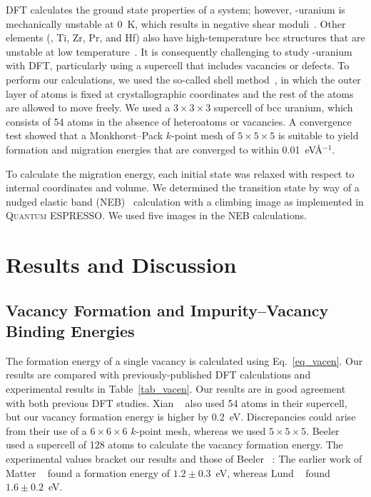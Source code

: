 DFT calculates the ground state properties of a system;
however, \textgamma-uranium is mechanically unstable at 0~K, which results in
negative shear moduli~\cite{soderlind1998theory}.
Other elements (\eg, Ti, Zr, Pr, and Hf)
also have high-temperature bcc structures that are unstable at low
temperature~\cite{ye1987phonon,sanchez1975model}. 
It is consequently challenging to study \textgamma-uranium with DFT,
particularly using a supercell that includes vacancies or defects.
To perform our calculations, we used the so-called shell
method~\cite{beeler2010first}, in which the outer layer of atoms is fixed at
crystallographic coordinates and the rest of the atoms are allowed to move
freely.
We used a $3\times3\times3$ supercell of bcc uranium, which consists of 54
atoms in the absence of heteroatoms or vacancies.
A convergence test showed that a Monkhorst--Pack $k$-point mesh of
$5\times5\times5$ is suitable to yield formation and migration energies
that are converged to within 0.01~eV\AA$^{-1}$.

To calculate the migration energy, each initial state was relaxed with respect
to internal coordinates and volume. We determined the transition state by way
of a nudged elastic band (NEB)~\cite{henkelman2000climbing,
    henkelman2000improved}
calculation with a climbing image as implemented in \textsc{Quantum ESPRESSO}. We used five images in the NEB calculations.

\section{Results and Discussion}\label{sec_result}
\subsection{Vacancy Formation and Impurity--Vacancy Binding Energies}

The formation energy of a single vacancy is calculated using
Eq.~\eqref{eq_vacen}. Our results are compared with previously-published DFT
calculations and experimental results in Table~\ref{tab_vacen}.
Our results are in good agreement with both previous DFT studies.
Xian \etal~\cite{xiang2008quantum} also used 54 atoms in their supercell, but
our vacancy formation energy is higher by 0.2~eV\@. Discrepancies could arise from
their use of a $6\times6\times6$ $k$-point mesh, whereas we used
$5\times5\times5$. Beeler \etal~\cite{beeler2010first} used a supercell of 128
atoms to calculate the vacancy formation energy. 
The experimental values bracket our results and those of Beeler
\etal~\cite{beeler2010first}: The earlier work of Matter
\etal~\cite{matter1980investigation} found a formation energy of
$1.2\pm0.3$~eV, whereas Lund \etal~\cite{lund2013vacancy} found
$1.6\pm0.2$~eV\@.

